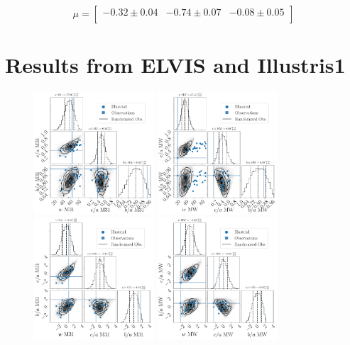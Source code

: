 \documentclass[a4paper,fleqn,usenatbib]{mnras}
\begin{document}
\[
\mu= 
\begin{bmatrix}
-0.32\pm 0.04 & -0.74\pm 0.07 &-0.08\pm 0.05\\
\end{bmatrix}
\]


\section{Results from ELVIS and Illustris1}
\label{appendix:plots}
\begin{figure}
\centering
\includegraphics[width=0.40\textwidth]{input_illustris1_obs_M31_n_11.pdf}
\includegraphics[width=0.40\textwidth]{input_illustris1_obs_MW_n_11.pdf}
\includegraphics[width=0.40\textwidth]{input_illustris1_obs_M31_n_11_normed.pdf}
\includegraphics[width=0.40\textwidth]{input_illustris1_obs_MW_n_11_normed.pdf}

\end{figure}
\end{document}
